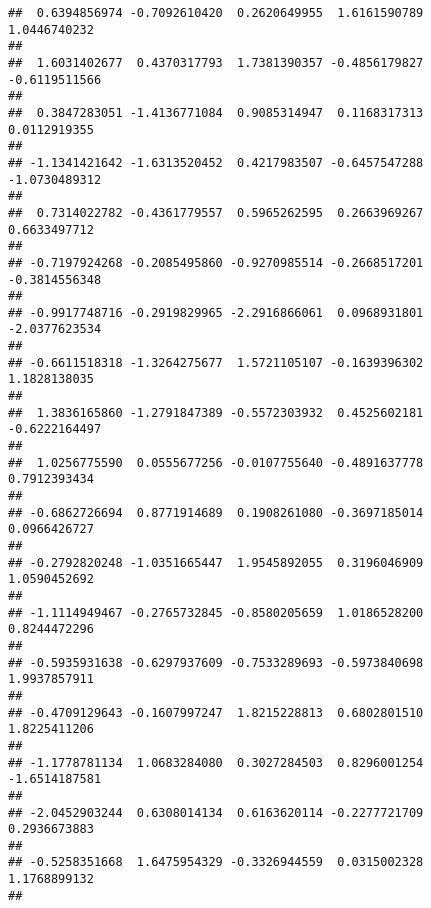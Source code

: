 \documentclass[]{article}
\begin{document}
\begin{verbatim}
##  0.6394856974 -0.7092610420  0.2620649955  1.6161590789  1.0446740232 
##                                                                       
##  1.6031402677  0.4370317793  1.7381390357 -0.4856179827 -0.6119511566 
##                                                                       
##  0.3847283051 -1.4136771084  0.9085314947  0.1168317313  0.0112919355 
##                                                                       
## -1.1341421642 -1.6313520452  0.4217983507 -0.6457547288 -1.0730489312 
##                                                                       
##  0.7314022782 -0.4361779557  0.5965262595  0.2663969267  0.6633497712 
##                                                                       
## -0.7197924268 -0.2085495860 -0.9270985514 -0.2668517201 -0.3814556348 
##                                                                       
## -0.9917748716 -0.2919829965 -2.2916866061  0.0968931801 -2.0377623534 
##                                                                       
## -0.6611518318 -1.3264275677  1.5721105107 -0.1639396302  1.1828138035 
##                                                                       
##  1.3836165860 -1.2791847389 -0.5572303932  0.4525602181 -0.6222164497 
##                                                                       
##  1.0256775590  0.0555677256 -0.0107755640 -0.4891637778  0.7912393434 
##                                                                       
## -0.6862726694  0.8771914689  0.1908261080 -0.3697185014  0.0966426727 
##                                                                       
## -0.2792820248 -1.0351665447  1.9545892055  0.3196046909  1.0590452692 
##                                                                       
## -1.1114949467 -0.2765732845 -0.8580205659  1.0186528200  0.8244472296 
##                                                                       
## -0.5935931638 -0.6297937609 -0.7533289693 -0.5973840698  1.9937857911 
##                                                                       
## -0.4709129643 -0.1607997247  1.8215228813  0.6802801510  1.8225411206 
##                                                                       
## -1.1778781134  1.0683284080  0.3027284503  0.8296001254 -1.6514187581 
##                                                                       
## -2.0452903244  0.6308014134  0.6163620114 -0.2277721709  0.2936673883 
##                                                                       
## -0.5258351668  1.6475954329 -0.3326944559  0.0315002328  1.1768899132 
##                                                                       

\end{verbatim}
\end{document}
